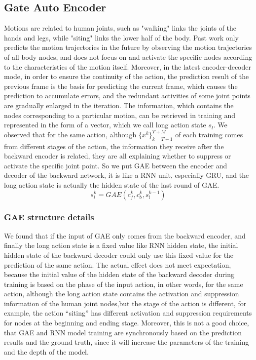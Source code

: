 \documentclass[conference]{IEEEtran}
\begin{document}
\subsection{Gate Auto Encoder}
Motions are related to human joints, such as "walking" links the joints of the hands and legs, while "siting" links the lower half of the body. Past work only predicts the motion trajectories in the future by observing the motion trajectories of all body nodes, and does not focus on and activate the specific nodes according to the characteristics of the motion itself. Moreover, in the latest encoder-decoder mode, in order to ensure the continuity of the action, the prediction result of the previous frame is the basis for predicting the current frame, which causes the prediction to accumulate errors, and the redundant activities of some joint points are gradually enlarged in the iteration.
The information, which contains the nodes corresponding to a particular motion, 
can be retrieved in training and represented in the form of a vector, which we call long action state $s_l$.
We observed that for the same action, although $\{x^k\}^{T+M}_{k=T+1}$ of each training comes from different stages of the action, 
the information they receive after the backward encoder is related, they are all explaining whether to suppress or activate the specific joint point.
So we put GAE between the encoder and decoder of the backward network, 
it is like a RNN unit, especially GRU, and the long action state is actually the hidden state of the last round of GAE.
\begin{equation}
s^k_l = GAE(c^k_f , c^k_b , s^{k-1}_l)\label{4}
\end{equation}
\subsubsection{GAE structure details}
We found that if the input of GAE only comes from the backward encoder, and finally the long action state is a fixed value like RNN hidden state, 
the initial hidden state of the backward decoder could only use this fixed value for the prediction of the same action. 
The actual effect does not meet expectation, because the initial value of the hidden state of the backward decoder during training is based on the phase of the input action,
in other words, for the same action, 
although the long action state contains the activation and suppression information of the human joint nodes,but the stage of the action is different,
for example, the action “siting” has different activation and suppression requirements for nodes at the beginning and ending stage. 
Moreover, this is not a good choice, that GAE and RNN model training are synchronously based on the prediction results and the ground truth, 
since it will increase the parameters of the training and the depth of the model.
\end{document}
